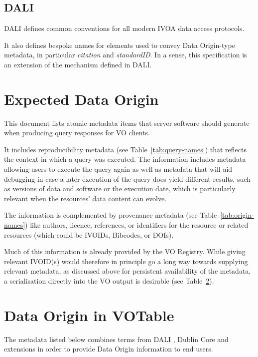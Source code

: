 \documentclass[11pt,a4paper]{ivoa}
\begin{document}
\subsection{DALI}
DALI \citep{2017ivoa.spec.0517D} defines common conventions for all
modern IVOA data access protocols.

It also defines bespoke names for  elements used to convey
Data Origin-type metadata, in particular \emph{citation} and \emph{standardID}.  In a sense,
this specification is an extension of the mechanism defined in DALI.

\section{Expected Data Origin}
This document lists atomic metadata items that server software should
generate when producing query responses for VO clients.

It includes reproducibility metadata (see Table~\ref{tab:query-names})
that reflects the context in which a query was executed. The information
includes metadata allowing users to execute the query again as well as
metadata that will aid debugging in case a later execution of the
query does yield different results, such as versions of data and software
or the execution
date, which is particularly relevant when the resources' data content
can evolve.


The information is complemented by provenance metadata (see Table~\ref{tab:origin-names}) like authors, licence, references, or identifiers
for the resource or related resources (which could be IVOIDs, Bibcodes, or DOIs).

Much of this information is already provided by the VO Registry.
While giving relevant IVOID(s) would therefore in principle go a long way
towards supplying relevant metadata, as discussed above for
persistent availability of the metadata, a serialisation
directly into the VO output is desirable
(see Table~\ref{sec:data-origin-in-votable}).


\section{Data Origin in VOTable}
\label{sec:data-origin-in-votable}
The metadata listed below combines terms from DALI \citep{2017ivoa.spec.0517D}, Dublin Core \citep{std:DUBLINCORE} and extensions in order to provide Data Origin information to end users.
\end{document}

